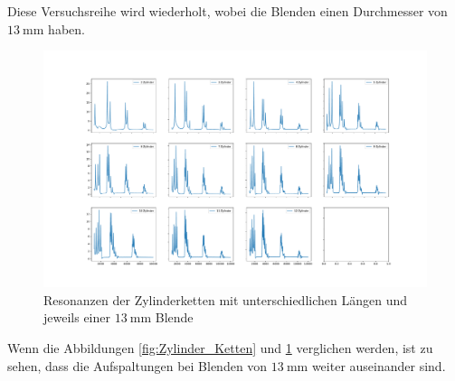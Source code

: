 Diese Versuchsreihe wird wiederholt, wobei die Blenden einen Durchmesser von $\SI{13}{\milli\meter}$ haben.
\FloatBarrier
\begin{figure}
    \centering
    \includegraphics[width=\textwidth,keepaspectratio]{figure/Zylinder_Ketten_13mm.pdf}
    \caption{Resonanzen der Zylinderketten mit unterschiedlichen Längen und jeweils einer $\SI{13}{\milli\meter}$ Blende}
    \label{fig:Zylinder_Ketten_13}
\end{figure}
\FloatBarrier
Wenn die Abbildungen \ref{fig:Zylinder_Ketten} und \ref{fig:Zylinder_Ketten_13} verglichen werden, ist zu sehen, dass die Aufspaltungen 
bei Blenden von $\SI{13}{\milli\meter}$ weiter auseinander sind.
